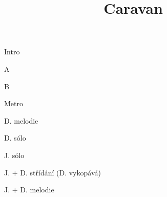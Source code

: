 \documentclass[timestamp]{jazzgrid}
\title{Caravan}
\begin{document}
\maketitle
\begin{musicsection}{Intro}
\barline
	{}
	{}
	{}
	{}
\barline
	{}
	{}
	{}
	{}
\end{musicsection}

\begin{musicsection}{A}
\barline
	{}
	{\barfour{}{}{}{}{}}
	{}
	{\barfour{}{}{}{}{}}
\barline
	{}
	{}
	{}
	{}
	{}
	{\barfour{}{}{}{}{}}
\end{musicsection}

\begin{musicsection}{B}
\barline
	{}
	{}
	{}
	{\barfour{}{}{}{}{}}
\barline
	{}
	{\barfour{}{}{}{}{}}
	{}
	{}
\end{musicsection}

\begin{musicsection}{Metro}
	{}
	{}
\end{musicsection}


\begin{multicols*}{2}
\begin{description}[noitemsep,align=right,labelwidth=\widthof{\scriptsize\bfseries{AABA}}]
	\scriptsize
	\item [Intro]
	\item [AABA] D. melodie
	\item [AABA] D. sólo
	\item [AABA] J. sólo
	\item [Metro]
	\item [AA\phantom{BA}] J. + D. střídání (D. vykopává)
	\item [\phantom{AA}BA] J. + D. melodie

\end{description}
\end{multicols*}
\end{document}
